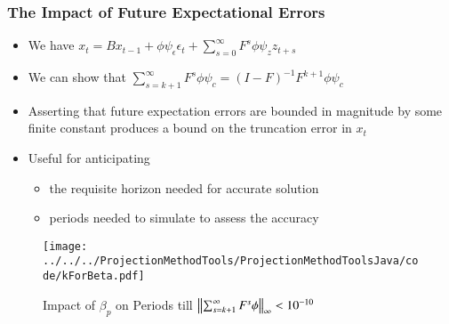 \documentclass{beamer}
\begin{document}
    \begin{frame}
      \frametitle{The Impact of Future Expectational Errors}
     
      \begin{itemize}
      	\item We have $
      		 x_{t} =B x_{t-1}+ \phi \psi_\epsilon\epsilon_t + \sum_{s=0}^\infty F^s \phi \psi_z z_{t+s}$ 
      	\item We can show that $\sum_{s=k+1}^{\infty} F^s \phi \psi_c = (I -F)^{-1} F^{k+1}\phi \psi_c$
      	\item Asserting that future expectation errors are bounded in magnitude by some finite  constant produces a bound on the truncation error in $x_t$
      	\item Useful for anticipating 
      	\begin{itemize}
       \item the requisite horizon needed for accurate solution
      	  \item periods needed to simulate to assess the accuracy
      	   	\end{itemize} 
      \end{itemize}
      \begin{figure}[H]
      	\caption{Impact of $\beta_p$ on Periods till $\left\lVert\sum_{s=k+1}^\infty F^s \phi\right\rVert_\infty<10^{-10}$}

\texttt{[image: ../../../ProjectionMethodTools/ProjectionMethodToolsJava/code/kForBeta.pdf]}  
      \end{figure}    
%
    \end{frame}

  
%     



  
%     

%  
\end{document}
